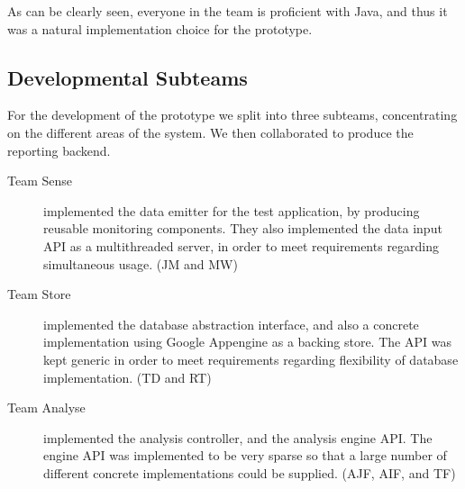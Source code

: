 As can be clearly seen, everyone in the team is proficient with Java, and thus
it was a natural implementation choice for the prototype.

\subsection{Developmental Subteams}
\label{sec:team-subteams}

For the development of the prototype we split into three subteams,
concentrating on the different areas of the system. We then collaborated to
produce the reporting backend.

\begin{description}
  \item[Team Sense] implemented the data emitter for the test application,
    by producing reusable monitoring components. They also implemented the data
    input API as a multithreaded server, in order to meet requirements
    regarding simultaneous usage. (JM and MW)

  \item[Team Store] implemented the database abstraction interface, and also a
    concrete implementation using Google Appengine as a backing store. The API
    was kept generic in order to meet requirements regarding flexibility of
    database implementation. (TD and RT)

  \item[Team Analyse] implemented the analysis controller, and the analysis
    engine API. The engine API was implemented to be very sparse so that a large
    number of different concrete implementations could be supplied. (AJF, AIF,
    and TF)
\end{description}

